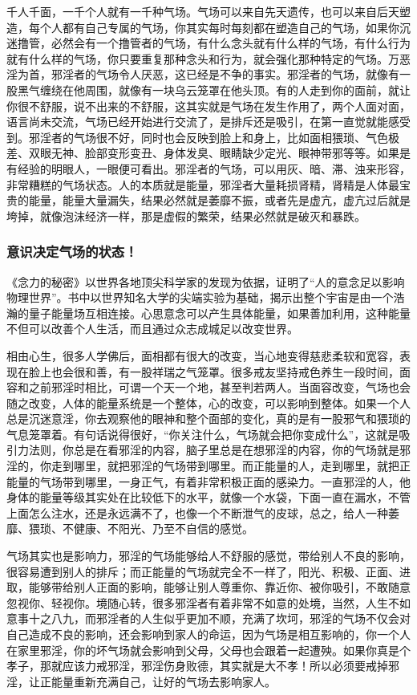 \documentclass{ctexart}
\begin{document}
千人千面，一千个人就有一千种气场。气场可以来自先天遗传，也可以来自后天塑造，每个人都有自己专属的气场，你其实每时每刻都在塑造自己的气场，如果你沉迷撸管，必然会有一个撸管者的气场，有什么念头就有什么样的气场，有什么行为就有什么样的气场，你只要重复那种念头和行为，就会强化那种特定的气场。万恶淫为首，邪淫者的气场令人厌恶，这已经是不争的事实。邪淫者的气场，就像有一股黑气缠绕在他周围，就像有一块乌云笼罩在他头顶。有的人走到你的面前，就让你很不舒服，说不出来的不舒服，这其实就是气场在发生作用了，两个人面对面，语言尚未交流，气场已经开始进行交流了，是排斥还是吸引，在第一直觉就能感受到。邪淫者的气场很不好，同时也会反映到脸上和身上，比如面相猥琐、气色极差、双眼无神、脸部变形变丑、身体发臭、眼睛缺少定光、眼神带邪等等。如果是有经验的明眼人，一眼便可看出。邪淫者的气场，可以用灰、暗、滞、浊来形容，非常糟糕的气场状态。人的本质就是能量，邪淫者大量耗损肾精，肾精是人体最宝贵的能量，能量大量漏失，结果必然就是萎靡不振，或者先是虚亢，虚亢过后就是垮掉，就像泡沫经济一样，那是虚假的繁荣，结果必然就是破灭和暴跌。

\subsubsection{意识决定气场的状态！}

《念力的秘密》以世界各地顶尖科学家的发现为依据，证明了“人的意念足以影响物理世界”。书中以世界知名大学的尖端实验为基础，揭示出整个宇宙是由一个浩瀚的量子能量场互相连接。心思意念可以产生具体能量，如果善加利用，这种能量不但可以改善个人生活，而且通过众志成城足以改变世界。

相由心生，很多人学佛后，面相都有很大的改变，当心地变得慈悲柔软和宽容，表现在脸上也会很和善，有一股祥瑞之气笼罩。很多戒友坚持戒色养生一段时间，面容和之前邪淫时相比，可谓一个天一个地，甚至判若两人。当面容改变，气场也会随之改变，人体的能量系统是一个整体，心的改变，可以影响到整体。如果一个人总是沉迷意淫，你去观察他的眼神和整个面部的变化，真的是有一股邪气和猥琐的气息笼罩着。有句话说得很好，“你关注什么，气场就会把你变成什么”，这就是吸引力法则，你总是在看邪淫的内容，脑子里总是在想邪淫的内容，你的气场就是邪淫的，你走到哪里，就把邪淫的气场带到哪里。而正能量的人，走到哪里，就把正能量的气场带到哪里，一身正气，有着非常积极正面的感染力。一直邪淫的人，他身体的能量等级其实处在比较低下的水平，就像一个水袋，下面一直在漏水，不管上面怎么注水，还是永远满不了，也像一个不断泄气的皮球，总之，给人一种萎靡、猥琐、不健康、不阳光、乃至不自信的感觉。

气场其实也是影响力，邪淫的气场能够给人不舒服的感觉，带给别人不良的影响，很容易遭到别人的排斥；而正能量的气场就完全不一样了，阳光、积极、正面、进取，能够带给别人正面的影响，能够让别人尊重你、靠近你、被你吸引，不敢随意忽视你、轻视你。境随心转，很多邪淫者有着非常不如意的处境，当然，人生不如意事十之八九，而邪淫者的人生似乎更加不顺，充满了坎坷，邪淫的气场不仅会对自己造成不良的影响，还会影响到家人的命运，因为气场是相互影响的，你一个人在家里邪淫，你的坏气场就会影响到父母，父母也会跟着一起遭殃。如果你真是个孝子，那就应该力戒邪淫，邪淫伤身败德，其实就是大不孝！所以必须要戒掉邪淫，让正能量重新充满自己，让好的气场去影响家人。
\end{document}
